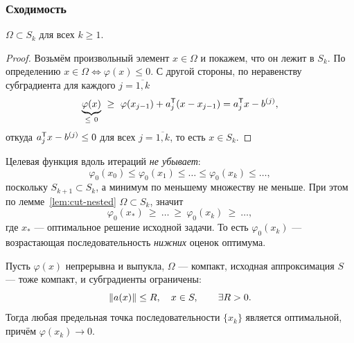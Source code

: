 \subsubsection*{Сходимость}

\begin{lemma}\label{lem:cut-nested}
$\Omega \subset S_k$ для всех $k \ge 1$.
\end{lemma}

\begin{proof}
Возьмём произвольный элемент $x \in \Omega$ и покажем, что он лежит в $S_k$.
По определению $x \in \Omega \iff \varphi(x) \le 0$. С другой стороны, по
неравенству субградиента для каждого $j = \overline{1,k}$
\[
  \underbrace{\varphi(x)}_{\le\ 0}
  \ \ge\ \varphi(x_{j-1}) + a_j^{\mathsf{T}} (x - x_{j-1})
  = a_j^{\mathsf{T}} x - b^{(j)} ,
\]
откуда $a_j^{\mathsf{T}} x - b^{(j)} \le 0$ для всех $j = \overline{1,k}$, то есть
$x \in S_k$.
\end{proof}

\begin{remark}
Целевая функция вдоль итераций \emph{не убывает}:
\[
  \varphi_0(x_0) \le \varphi_0(x_1) \le \dots \le \varphi_0(x_k) \le \dots ,
\]
поскольку $S_{k+1} \subset S_k$, а минимум по меньшему множеству не меньше. При
этом по лемме~\ref{lem:cut-nested} $\Omega \subset S_k$, значит
\[
  \varphi_0(x_*) \ \ge\ \dots \ \ge\ \varphi_0(x_k) \ \ge\ \dots ,
\]
где $x_*$ — оптимальное решение исходной задачи. То есть $\varphi_0(x_k)$ —
возрастающая последовательность \emph{нижних} оценок оптимума.
\end{remark}

\begin{theorem}\label{thm:cutting-plane}
Пусть $\varphi(x)$ непрерывна и выпукла, $\Omega$ — компакт, исходная
аппроксимация $S$ — тоже компакт, и субградиенты ограничены:
\[
  \left\lVert a(x) \right\rVert \le R , \quad x \in S , \qquad \exists R > 0 .
\]
Тогда любая предельная точка последовательности $\{x_k\}$ является оптимальной,
причём $\varphi(x_k) \to 0$.
\end{theorem}

